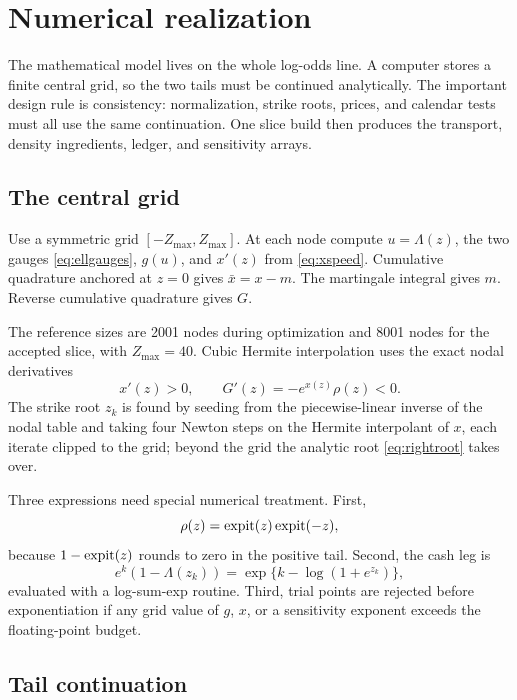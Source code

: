 \section{Numerical realization}
\label{sec:numerics}

The mathematical model lives on the whole log-odds line.  A computer stores a
finite central grid, so the two tails must be continued analytically.  The
important design rule is consistency: normalization, strike roots, prices,
and calendar tests must all use the same continuation.  One slice build then
produces the transport, density ingredients, ledger, and sensitivity arrays.

\subsection{The central grid}

Use a symmetric grid $[-Z_{\max},Z_{\max}]$.  At each node compute
$u=\Lambda(z)$, the two gauges \eqref{eq:ellgauges}, $g(u)$, and $x'(z)$ from
\eqref{eq:xspeed}.  Cumulative quadrature anchored at $z=0$ gives
$\bar x=x-m$.  The martingale integral gives $m$.  Reverse cumulative
quadrature gives $G$.

The reference sizes are 2001 nodes during optimization and 8001 nodes for the
accepted slice, with $Z_{\max}=40$.  Cubic Hermite interpolation uses the exact
nodal derivatives
\begin{equation}
x'(z)>0,
\qquad G'(z)=-e^{x(z)}\rho(z)<0.
\label{eq:nodalderivatives}
\end{equation}
The strike root $z_k$ is found by seeding from the piecewise-linear
inverse of the nodal table and taking four Newton steps on the Hermite
interpolant of $x$, each iterate clipped to the grid; beyond the grid
the analytic root \eqref{eq:rightroot} takes over.

Three expressions need special numerical treatment.  First,
\[
\rho(z)=\operatorname{expit}(z)\operatorname{expit}(-z),
\]
because $1-\operatorname{expit}(z)$ rounds to zero in the positive tail.  Second, the cash
leg is
\[
e^k(1-\Lambda(z_k))
=\exp\{k-\log(1+e^{z_k})\},
\]
evaluated with a log-sum-exp routine.  Third, trial points are rejected before
exponentiation if any grid value of $g$, $x$, or a sensitivity exponent exceeds
the floating-point budget.

\subsection{Tail continuation}

